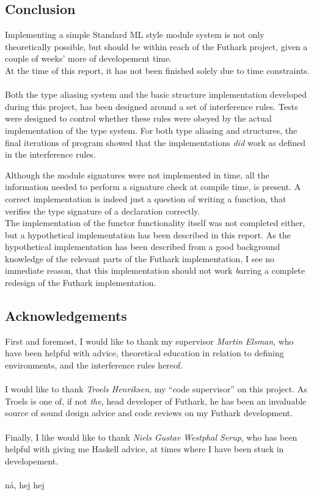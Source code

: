\subsection{Conclusion}
Implementing a simple Standard ML style module system is not only theoretically
possible, but should be within reach of the Futhark project, given a couple of
weeks' more of developement time.
\\
At the time of this report, it has not been finished solely due to time constraints.
\\
\\
Both the type aliasing system and the basic structure implementation developed
during this project, has been designed around a set of interference rules.
Tests were designed to control whether these rules were obeyed by the actual
implementation of the type system.
For both type aliasing and structures, the final iterations of program showed
that the implementations \textit{did} work as defined in the interference rules.

Although the module signatures were not implemented in time, all the information
needed to perform a signature check at compile time, is present. A correct
implementation is indeed just a question of writing a function, that verifies
the type signature of a declaration correctly.
\\
The implementation of the functor functionality itself was not completed either,
but a hypothetical implementation has been described in this report.
As the hypothetical implementation has been described from a good background knowledge
of the relevant parts of the Futhark implementation, I see no immediate reason,
that this implementation should not work \emph barring a complete redesign of
the Futhark implementation.

\subsection{Acknowledgements}
\label{subsec:acknow}
First and foremost, I would like to thank my supervisor \textit{Martin Elsman}, who have
been helpful with advice, theoretical education in relation to defining
environments, and the interference rules hereof.
\\
\\
I would like to thank \textit{Troels Henriksen}, my ``code supervisor'' on this
project. As Troels is one of, if not \textit{the}, head developer of Futhark, he
has been an invaluable source of sound design advice and code reviews on my Futhark
development.
\\
\\
Finally, I like would like to thank \textit{Niels Gustav Westphal Serup}, who
has been helpful with giving me Haskell advice, at times where I have been stuck
in developement.
\\
\\
nå, hej hej

